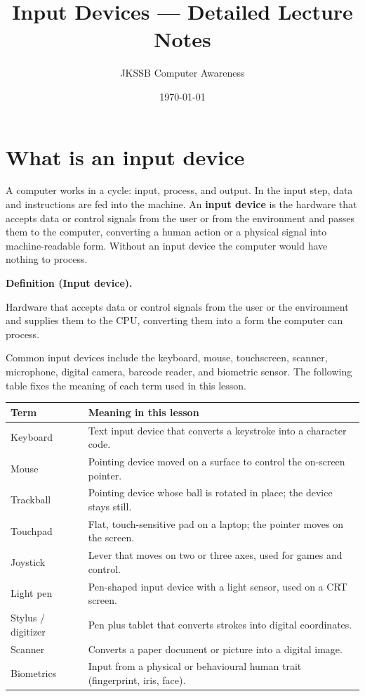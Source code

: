 \documentclass[11pt]{article}
\title{Input Devices --- Detailed Lecture Notes}
\author{JKSSB Computer Awareness}
\date{\today}
\newenvironment{definitionbox}[1]{%
  \par\noindent\textbf{Definition (#1).}\ \itshape
}{\par\vspace{0.3em}}
\begin{document}
\maketitle

\section{What is an input device}
A computer works in a cycle: input, process, and output. In the input step,
data and instructions are fed into the machine. An \textbf{input device} is
the hardware that accepts data or control signals from the user or from the
environment and passes them to the computer, converting a human action or a
physical signal into machine-readable form. Without an input device the
computer would have nothing to process.

\begin{definitionbox}{Input device}
Hardware that accepts data or control signals from the user or the
environment and supplies them to the CPU, converting them into a form the
computer can process.
\end{definitionbox}

Common input devices include the keyboard, mouse, touchscreen, scanner,
microphone, digital camera, barcode reader, and biometric sensor. The
following table fixes the meaning of each term used in this lesson.

\begin{center}
\begin{tabular}{p{}p{}}
\toprule
\textbf{Term} & \textbf{Meaning in this lesson} \\
\midrule
Keyboard & Text input device that converts a keystroke into a character code. \\
Mouse & Pointing device moved on a surface to control the on-screen pointer. \\
Trackball & Pointing device whose ball is rotated in place; the device stays still. \\
Touchpad & Flat, touch-sensitive pad on a laptop; the pointer moves on the screen. \\
Joystick & Lever that moves on two or three axes, used for games and control. \\
Light pen & Pen-shaped input device with a light sensor, used on a CRT screen. \\
Stylus / digitizer & Pen plus tablet that converts strokes into digital coordinates. \\
Scanner & Converts a paper document or picture into a digital image. \\
Biometrics & Input from a physical or behavioural human trait (fingerprint, iris, face). \\
\bottomrule
\end{tabular}
\end{center}
\end{document}
